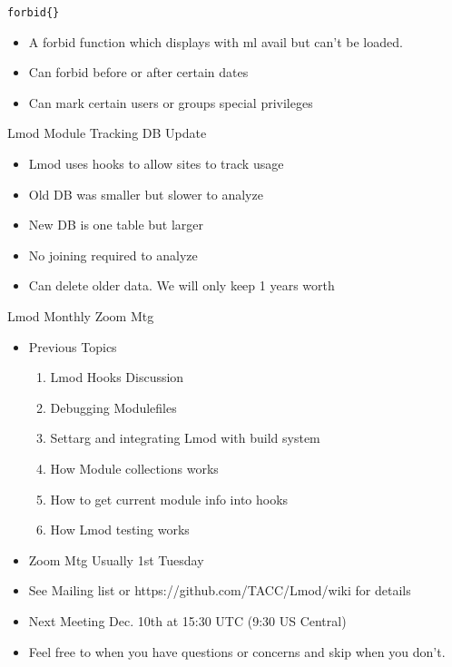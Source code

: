 \documentclass{beamer}
\begin{document}
\begin{frame}{\texttt{forbid\{\}}}
  \begin{itemize}
    \item A forbid function which displays with ml avail but can't be loaded.
    \item Can forbid before or after certain dates
    \item Can mark certain users or groups special privileges
  \end{itemize}
\end{frame}

\begin{frame}{Lmod Module Tracking DB Update }
  \begin{itemize}
    \item Lmod uses hooks to allow sites to track usage
    \item Old DB was smaller but slower to analyze
    \item New DB is one table but larger
    \item No joining required to analyze
    \item Can delete older data. We will only keep 1 years worth
  \end{itemize}
\end{frame}

\begin{frame}{Lmod Monthly Zoom Mtg}
  \begin{itemize}
    \item Previous Topics
      \begin{enumerate}
        \item Lmod Hooks Discussion
        \item Debugging Modulefiles
        \item Settarg and integrating Lmod with build system
        \item How Module collections works 
        \item How to get current module info into hooks
        \item How Lmod testing works
      \end{enumerate}
    \item Zoom Mtg Usually 1st Tuesday 
    \item See Mailing list or https://github.com/TACC/Lmod/wiki for
      details
    \item Next Meeting Dec. 10th at 15:30 UTC (9:30 US Central)
    \item Feel free to when you have questions or concerns and skip
      when you don't.
  \end{itemize}
\end{frame}
\end{document}
